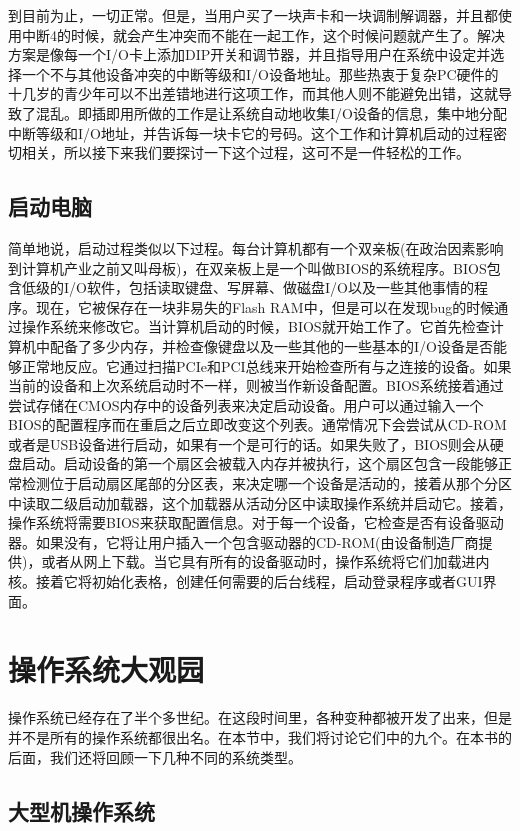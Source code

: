 	到目前为止，一切正常。但是，当用户买了一块声卡和一块调制解调器，并且都使用中断4的时候，就会产生冲突而不能在一起工作，这个时候问题就产生了。解决方案是像每一个I/O卡上添加DIP开关和调节器，并且指导用户在系统中设定并选择一个不与其他设备冲突的中断等级和I/O设备地址。那些热衷于复杂PC硬件的十几岁的青少年可以不出差错地进行这项工作，而其他人则不能避免出错，这就导致了混乱。即插即用所做的工作是让系统自动地收集I/O设备的信息，集中地分配中断等级和I/O地址，并告诉每一块卡它的号码。这个工作和计算机启动的过程密切相关，所以接下来我们要探讨一下这个过程，这可不是一件轻松的工作。
	
	\subsection{启动电脑}
	
	简单地说，启动过程类似以下过程。每台计算机都有一个双亲板(在政治因素影响到计算机产业之前又叫母板)，在双亲板上是一个叫做BIOS的系统程序。BIOS包含低级的I/O软件，包括读取键盘、写屏幕、做磁盘I/O以及一些其他事情的程序。现在，它被保存在一块非易失的Flash RAM中，但是可以在发现bug的时候通过操作系统来修改它。当计算机启动的时候，BIOS就开始工作了。它首先检查计算机中配备了多少内存，并检查像键盘以及一些其他的一些基本的I/O设备是否能够正常地反应。它通过扫描PCIe和PCI总线来开始检查所有与之连接的设备。如果当前的设备和上次系统启动时不一样，则被当作新设备配置。BIOS系统接着通过尝试存储在CMOS内存中的设备列表来决定启动设备。用户可以通过输入一个BIOS的配置程序而在重启之后立即改变这个列表。通常情况下会尝试从CD-ROM或者是USB设备进行启动，如果有一个是可行的话。如果失败了，BIOS则会从硬盘启动。启动设备的第一个扇区会被载入内存并被执行，这个扇区包含一段能够正常检测位于启动扇区尾部的分区表，来决定哪一个设备是活动的，接着从那个分区中读取二级启动加载器，这个加载器从活动分区中读取操作系统并启动它。接着，操作系统将需要BIOS来获取配置信息。对于每一个设备，它检查是否有设备驱动器。如果没有，它将让用户插入一个包含驱动器的CD-ROM(由设备制造厂商提供)，或者从网上下载。当它具有所有的设备驱动时，操作系统将它们加载进内核。接着它将初始化表格，创建任何需要的后台线程，启动登录程序或者GUI界面。
	
	\section{操作系统大观园}
	
	操作系统已经存在了半个多世纪。在这段时间里，各种变种都被开发了出来，但是并不是所有的操作系统都很出名。在本节中，我们将讨论它们中的九个。在本书的后面，我们还将回顾一下几种不同的系统类型。
	
	\subsection{大型机操作系统}
	

